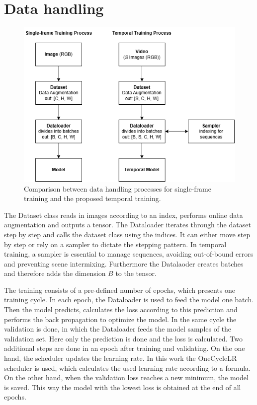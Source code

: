 \section{Data handling}
\label{sec:datahandling}

\begin{figure}[H]
    \centering
    \includegraphics[width=0.6\linewidth]{PICs/temporalModels/Datahandling.png}
    \caption{Comparison between data handling processes for single-frame training and the proposed temporal training.}
    \label{fig:dataHandlingProcess}
\end{figure}

The Dataset class reads in images according to an index, performs online data augmentation and outputs a tensor.
The Dataloader iterates through the dataset step by step and calls the dataset class using the indices.
It can either move step by step or rely on a sampler to dictate the stepping pattern.
In temporal training, a sampler is essential to manage sequences, avoiding out-of-bound errors and preventing scene intermixing.
Furthermore the Datalaoder creates batches and therefore adds the dimension $B$ to the tensor.

The training consists of a pre-defined number of epochs, which presents one training cycle.
In each epoch, the Dataloader is used to feed the model one batch.
Then the model predicts, calculates the loss according to this prediction and performs the back propagation to optimize the model.
In the same cycle the validation is done, in which the Dataloader feeds the model samples of the validation set.
Here only the prediction is done and the loss is calculated.
Two additional steps are done in an epoch after training and validating.
On the one hand, the scheduler updates the learning rate.
In this work the OneCycleLR scheduler \cite{pytorch_oneCycleLR_docu} is used, which calculates the used learning rate according to a formula.
On the other hand, when the validation loss reaches a new minimum, the model is saved.
This way the model with the lowest loss is obtained at the end of all epochs.